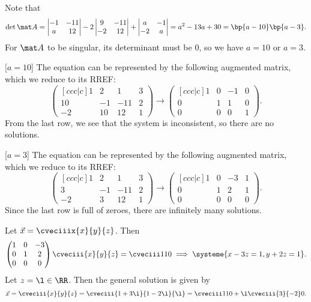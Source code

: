 \begin{solution}
    Note that \[\det \mat A = \begin{vmatrix}-1 & -11 \\ a & 12\end{vmatrix} - 2 \begin{vmatrix}9 & -11 \\ -2 & 12\end{vmatrix} + \begin{vmatrix}a & -1 \\ -2 & a\end{vmatrix} = a^2 - 13 a + 30 = \bp{a-10}\bp{a-3}.\] For $\mat A$ to be singular, its determinant must be 0, so we have $a = 10$ or $a = 3$.

    [$a = 10$] The equation can be represented by the following augmented matrix, which we reduce to its RREF: \[\begin{pmatrix}[ccc|c] 1 & 2 & 1 & 3 \\ 10 & -1 & -11 & 2 \\ -2 & 10 & 12 & 1\end{pmatrix} \rightarrow \begin{pmatrix}[ccc|c]1 & 0 & -1 & 0 \\ 0 & 1 & 1 & 0 \\ 0 & 0 & 0 & 1\end{pmatrix}.\] From the last row, we see that the system is inconsistent, so there are no solutions.

    [$a = 3$] The equation can be represented by the following augmented matrix, which we reduce to its RREF: \[\begin{pmatrix}[ccc|c] 1 & 2 & 1 & 3 \\ 3 & -1 & -11 & 2 \\ -2 & 3 & 12 & 1\end{pmatrix} \rightarrow \begin{pmatrix}[ccc|c]1 & 0 & -3 & 1 \\ 0 & 1 & 2 & 1 \\ 0 & 0 & 0 & 0\end{pmatrix}.\] Since the last row is full of zeroes, there are infinitely many solutions.

    Let $\vec x = \cveciiix{x}{y}{z}$. Then \[\begin{pmatrix}1 & 0 & -3 \\ 0 & 1 & 2 \\ 0 & 0 & 0\end{pmatrix}\cveciii{x}{y}{z} = \cveciii110 \implies \systeme{x-3z=1,y+2z=1}.\] Let $z = \l \in \RR$. Then the general solution is given by \[\vec x = \cveciii{x}{y}{z} = \cveciii{1 + 3\l}{1 - 2\l}{\l} = \cveciii110 + \l \cveciii{3}{-2}0.\]
\end{solution}

